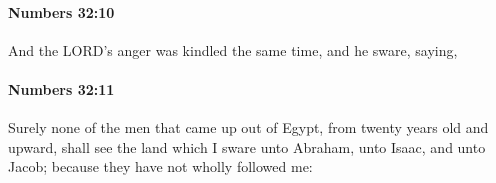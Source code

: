 		\paragraph{Numbers 32:10} %
			\label{NUMBERS-32-10}

			And the LORD’s anger was kindled the same time, and he sware, saying,


		\paragraph{Numbers 32:11} %
			\label{NUMBERS-32-11}

			Surely none of the men that came up out of Egypt, from twenty years old and upward, shall see the land which I sware unto Abraham, unto Isaac, and unto Jacob; because they have not wholly followed me:


